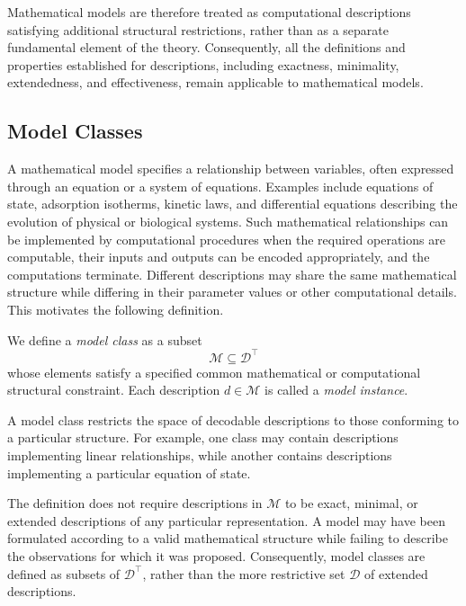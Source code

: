 Mathematical models are therefore treated as computational descriptions satisfying additional structural restrictions, rather than as a separate fundamental element of the theory. Consequently, all the definitions and properties established for descriptions, including exactness, minimality, extendedness, and effectiveness, remain applicable to mathematical models.


\subsection*{Model Classes}

A mathematical model specifies a relationship between variables, often expressed through an equation or a system of equations. Examples include equations of state, adsorption isotherms, kinetic laws, and differential equations describing the evolution of physical or biological systems. Such mathematical relationships can be implemented by computational procedures when the required operations are computable, their inputs and outputs can be encoded appropriately, and the computations terminate. Different descriptions may share the same mathematical structure while differing in their parameter values or other computational details. This motivates the following definition.

\begin{definition}
\label{def:model_class}
We define a \emph{model class} as a subset
\[
\mathcal{M}\subseteq\mathcal{D}^\top
\]
whose elements satisfy a specified common mathematical or computational structural constraint. Each description $d\in\mathcal{M}$ is called a \emph{model instance}.
\end{definition}

A model class restricts the space of decodable descriptions to those conforming to a particular structure. For example, one class may contain descriptions implementing linear relationships, while another contains descriptions implementing a particular equation of state.

The definition does not require descriptions in $\mathcal{M}$ to be exact, minimal, or extended descriptions of any particular representation. A model may have been formulated according to a valid mathematical structure while failing to describe the observations for which it was proposed. Consequently, model classes are defined as subsets of $\mathcal{D}^\top$, rather than the more restrictive set $\mathcal{D}$ of extended descriptions.

